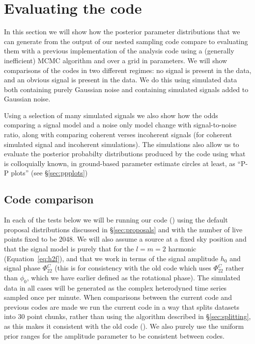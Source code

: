 \section{Evaluating the code}

In this section we will show how the posterior parameter distributions that we can generate from the output
of our nested sampling code compare to evaluating them with a previous implementation of the analysis code
\citep[\lppef, or for the rest of this document shortened to \lppe, used in, e.g.,][]{2014ApJ...785..119A} using a (generally inefficient) MCMC algorithm
and over a grid in parameters. We will show comparisons of the codes in two different regimes: no signal is present in the data, and an obvious signal is
present in the data. We do this using simulated data both containing purely Gaussian noise and containing simulated signals
added to Gaussian noise.

Using a selection of many simulated signals we also show how the odds comparing a signal model and a noise only model change with
signal-to-noise ratio, along with comparing coherent verses incoherent signals (for coherent simulated signal and incoherent simulations).
The simulations also allow us to evaluate the posterior probabilty distributions produced by the code using what is colloquially known,
in ground-based \gw parameter estimate circles at least, as ``P-P plots'' (see \S\ref{sec:ppplots})

\subsection{Code comparison}

In each of the tests below we will be running our code (\lppen) using the default proposal distributions discussed in \S\ref{sec:proposals}
and with the number of live points fixed to be 2048. We will also assume a source at a fixed sky position and that the signal model is purely
that for the $l=m=2$ harmonic (Equation~\ref{eq:h2f}), and that we work in terms of the signal amplitude $h_0$ and signal phase
$\Phi_{22}^C$ (this is for consistency with the old code which uses $\Phi_{22}^C$ rather than $\phi_0$, which we have earlier defined as the
rotational phase). The simulated data in all cases 
will be generated as the complex heterodyned
time series sampled once per minute. When comparisons between the current code and previous codes are 
made we run the current code in a way that splits datasets into 30 point chunks, rather than using the algorithm described in \S\ref{sec:splitting},
as this makes it consistent with the old code (\lppe). We also purely use the uniform prior ranges for the amplitude parameter to be
consistent between codes.

